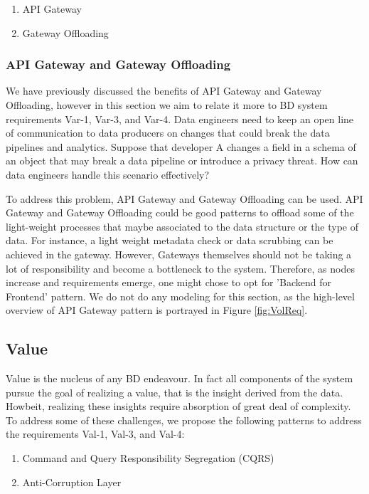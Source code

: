 \documentclass{bmcart}
\begin{document}
\begin{enumerate}
  \item API Gateway
  \item Gateway Offloading
\end{enumerate}


\subsubsection{API Gateway and Gateway Offloading}

We have previously discussed the benefits of API Gateway and Gateway Offloading, however in this section we aim to relate it more to BD system requirements Var-1, Var-3, and Var-4. Data engineers need to keep an open line of communication to data producers on changes that could break the data pipelines and analytics. Suppose that developer A changes a field in a schema of an object that may break a data pipeline or introduce a privacy threat. How can data engineers handle this scenario effectively? 

To address this problem, API Gateway and Gateway Offloading can be used. API Gateway and Gateway Offloading could be good patterns to offload some of the light-weight processes that maybe associated to the data structure or the type of data. For instance, a light weight metadata check or data scrubbing can be achieved in the gateway. However, Gateways themselves should not be taking a lot of responsibility and become a bottleneck to the system. Therefore, as nodes increase and requirements emerge, one might chose to opt for 'Backend for Frontend' pattern. We do not do any modeling for this section, as the high-level overview of API Gateway pattern is portrayed in Figure \ref{fig:VolReq}.

\subsection{Value}

Value is the nucleus of any BD endeavour. In fact all components of the system pursue the goal of realizing a value, that is the insight derived from the data. Howbeit, realizing these insights require absorption of great deal of complexity. To address some of these challenges, we propose the following patterns to address the requirements Val-1, Val-3, and Val-4:

\begin{enumerate}
  \item Command and Query Responsibility Segregation (CQRS)
  \item  Anti-Corruption Layer
\end{enumerate}
\end{document}
